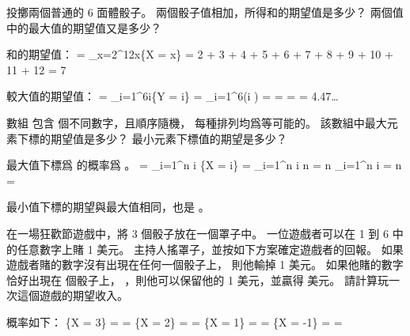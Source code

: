 \startsection[
  title={Discrete random variables},
]

\startEXERCISE
投擲兩個普通的 6 面體骰子。
兩個骰子值相加，所得和的期望值是多少？
兩個值中的最大值的期望值又是多少？
\stopEXERCISE

\startANSWER
和的期望值：
\startformula\startmathalignment
\NC \E[X] \NC = \sum_{x=2}^{12}x\Pr\{X = x\} \NR
\NC \NC =  2 \cdot {} +
           3 \cdot {} +
           4 \cdot {} +
           5 \cdot {} +
           6 \cdot {} +
           7 \cdot {} +
           8 \cdot {} +
           9 \cdot {} +
          10 \cdot {} +
          11 \cdot {} +
          12 \cdot {} \NR
\NC \NC = 7 \NR
\stopmathalignment\stopformula

較大值的期望值：
\startformula\startmathalignment
\NC \E[Y]
    \NC = \sum_{i=1}^{6}i\Pr\{Y = i\} \NR
\NC \NC = \sum_{i=1}^{6}\left(i \cdot {}\right) \NR
\NC \NC =  \NR
\NC \NC =  \NR
\NC \NC =  = 4.47\ldots \NR
\stopmathalignment\stopformula
\stopANSWER

\startEXERCISE
數組  包含  個不同數字，且順序隨機，
每種排列均爲等可能的。
該數組中最大元素下標的期望值是多少？
最小元素下標值的期望是多少？
\stopEXERCISE

\startANSWER
最大值下標爲  的概率爲 。
\startformula\startmathalignment
\NC \E[X]
    \NC = \sum_{i=1}^n i \cdot \Pr\{X = i\} \NR
\NC \NC = \sum_{i=1}^n i \cdot {} n \NR
\NC \NC =  n \sum_{i=1}^n i \NR
\NC \NC =  n  \NR
\NC \NC =  \NR
\stopmathalignment\stopformula

最小值下標的期望與最大值相同，也是 。
\stopANSWER

\startEXERCISE
在一場狂歡節遊戲中，將 3 個骰子放在一個罩子中。
一位遊戲者可以在 1 到 6 中的任意數字上賭 1 美元。
主持人搖罩子，並按如下方案確定遊戲者的回報。
如果遊戲者賭的數字沒有出現在任何一個骰子上，
則他輸掉 1 美元。
如果他賭的數字恰好出現在  個骰子上，
 ，則他可以保留他的 1 美元，並贏得  美元。
請計算玩一次這個遊戲的期望收入。
\stopEXERCISE

\startANSWER
概率如下：
\startformula\startmathalignment
\NC \Pr\{X = 3\} \NC =  \cdot {} \cdot {}
                     =  \NR
\NC \Pr\{X = 2\} \NC = 
                       \cdot {} \cdot {} \cdot {}
		     =  \NR
\NC \Pr\{X = 1\} \NC = 
                       \cdot {} \cdot {} \cdot {}
		     =  \NR
\NC \Pr\{X = -1\} \NC =  \cdot {} \cdot {}
		     =  \NR
\stopmathalignment\stopformula


